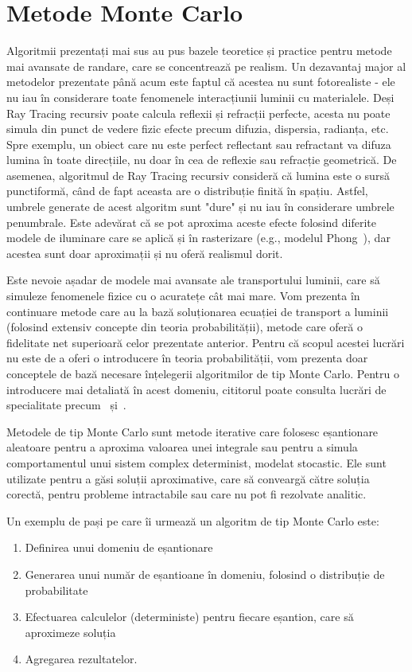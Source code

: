 \documentclass[12pt,a4paper]{report}
\numberwithin{equation}{section} %
\begin{document}
\section{Metode Monte Carlo}

Algoritmii prezentați mai sus au pus bazele teoretice și practice pentru metode
mai avansate de randare, care se concentrează pe realism. Un dezavantaj major al
metodelor prezentate până acum este faptul că acestea nu sunt fotorealiste - ele
nu iau în considerare toate fenomenele interacțiunii luminii cu materialele. Deși
Ray Tracing recursiv poate calcula reflexii și refracții perfecte, acesta nu poate simula
din punct de vedere fizic efecte precum difuzia, dispersia, radianța, etc. Spre exemplu,
un obiect care nu este perfect reflectant sau refractant va difuza lumina în toate
direcțiile, nu doar în cea de reflexie sau refracție geometrică. De asemenea,
algoritmul de Ray Tracing recursiv consideră că lumina este o sursă punctiformă,
când de fapt aceasta are o distribuție finită în spațiu. Astfel, umbrele generate
de acest algoritm sunt "dure" și nu iau în considerare umbrele penumbrale. Este
adevărat că se pot aproxima aceste efecte folosind diferite modele de iluminare
care se aplică și în rasterizare (e.g., modelul Phong~\cite{Phong}),
dar acestea sunt doar aproximații și nu oferă realismul dorit.

Este nevoie așadar de modele mai avansate ale transportului luminii, care să
simuleze fenomenele fizice cu o acuratețe cât mai mare. Vom prezenta în continuare
metode care au la bază soluționarea ecuației de transport a luminii~\cite{Kajiya}
(folosind extensiv concepte din teoria probabilității), metode
care oferă o fidelitate net superioară celor prezentate anterior.
Pentru că scopul acestei lucrări nu este de a oferi o
introducere în teoria probabilității, vom prezenta doar conceptele de bază necesare
înțelegerii algoritmilor de tip Monte Carlo. Pentru o introducere mai detaliată în
acest domeniu, cititorul poate consulta lucrări de specialitate precum~\cite{Halton}
și~\cite{Hammersley}.

Metodele de tip Monte Carlo sunt metode
iterative care folosesc eșantionare aleatoare pentru a aproxima valoarea unei
integrale sau pentru a simula comportamentul unui sistem complex determinist,
modelat stocastic. Ele sunt utilizate pentru a găsi soluții aproximative, care
să conveargă către soluția corectă, pentru probleme intractabile sau care nu pot
fi rezolvate analitic.

Un exemplu de pași pe care îi urmează un algoritm de tip Monte Carlo este:
\begin{enumerate}
	\item Definirea unui domeniu de eșantionare
	\item Generarea unui număr de eșantioane în domeniu, folosind o distribuție de probabilitate
	\item Efectuarea calculelor (deterministe) pentru fiecare eșantion, care să aproximeze soluția
	\item Agregarea rezultatelor.
\end{enumerate}
\end{document}

